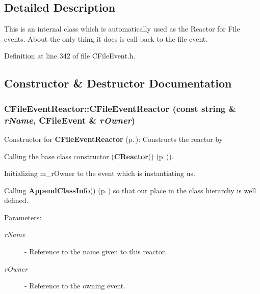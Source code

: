 \subsection{Detailed Description}
This is an internal class which is automatically used as the  Reactor for File events. About the only thing it does is call back to the file event. 



Definition at line 342 of file CFile\-Event.h.

\subsection{Constructor \& Destructor Documentation}
\subsubsection{\setlength{\rightskip}{0pt plus 5cm}CFile\-Event\-Reactor::CFile\-Event\-Reactor (const string \& {\em r\-Name}, {\bf CFile\-Event} \& {\em r\-Owner})}\label{classCFileEvent_1_1CFileEventReactor_a0}


Constructor for {\bf CFile\-Event\-Reactor} {\rm (p.\,\pageref{classCFileEvent_1_1CFileEventReactor})}: Constructs the reactor by \begin{CompactItemize}
\item 
Calling the base class constructor ({\bf CReactor}() {\rm (p.\,\pageref{classCReactor_a0})}).\item 
Initializing m\_\-r\-Owner to the event which is instantiating us.\item 
Calling {\bf Append\-Class\-Info}() {\rm (p.\,\pageref{classCNamedObject_b2})} so that our place in the class hierarchy is well defined.\end{CompactItemize}
\begin{Desc}
\item[Parameters: ]\par
\begin{description}
\item[{\em 
r\-Name}]- Reference to the name given to this reactor. \item[{\em 
r\-Owner}]- Reference to the owning event. \end{description}
\end{Desc}



